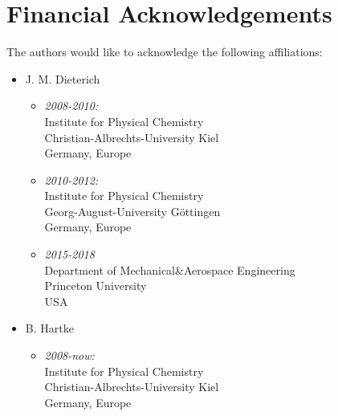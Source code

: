 \documentclass[a4paper,10pt]{scrbook}
\begin{document}
\section{Financial Acknowledgements}
The authors would like to acknowledge the following affiliations:
\begin{itemize}
 \item J. M. Dieterich
 \begin{itemize}
   \item \textit{2008-2010:}\\Institute for Physical 
Chemistry\\Christian-Albrechts-University Kiel\\Germany, Europe
   \item \textit{2010-2012:}\\Institute for Physical 
Chemistry\\Georg-August-University G\"ottingen\\Germany, Europe
   \item \textit{2015-2018}\\Department of Mechanical\&Aerospace 
Engineering\\Princeton University\\USA
 \end{itemize}
 \item B. Hartke
 \begin{itemize}
   \item \textit{2008-now:}\\Institute for Physical 
Chemistry\\Christian-Albrechts-University Kiel\\Germany, Europe
 \end{itemize}
\end{itemize}
\end{document}
